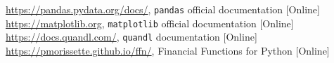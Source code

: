 \begin{thebibliography}{9}
 \href{https://pandas.pydata.org/docs/}{https://pandas.pydata.org/docs/}, \texttt{pandas} official documentation [Online]
 \href{https://matplotlib.org}{https://matplotlib.org}, \texttt{matplotlib} official documentation [Online]
 \href{https://docs.quandl.com/}{https://docs.quandl.com/}, \texttt{quandl} documentation [Online]
 \href{https://pmorissette.github.io/ffn/}{https://pmorissette.github.io/ffn/}, Financial Functions for Python [Online]
\end{thebibliography}
